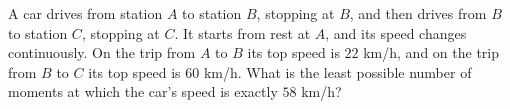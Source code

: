 A car drives from station \(A\) to station \(B\), stopping at \(B\), and then drives from \(B\) to station \(C\), stopping at \(C\). It starts from rest at \(A\), and its speed changes continuously. On the trip from \(A\) to \(B\) its top speed is \(22\) km/h, and on the trip from \(B\) to \(C\) its top speed is \(60\) km/h. What is the least possible number of moments at which the car's speed is exactly \(58\) km/h?
